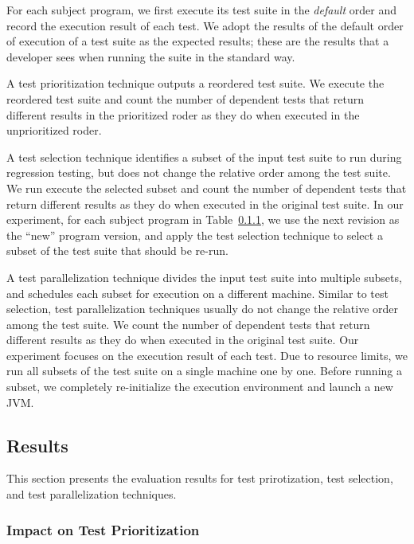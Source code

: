 For each subject program, we first execute its
test suite in the \textit{default} order and record
the execution result of each test.
We adopt the results of the default
order of execution of a test suite as the expected results; these
are the results that a developer sees when running the suite
in the standard way. 

A test prioritization technique outputs a reordered test suite.
We execute the reordered test suite and count the number
of dependent tests that return different results
in the prioritized roder as they do when executed in the
unprioritized roder.

A test selection technique identifies a subset of the
input test suite to run during regression testing, but does not
change the relative order among the test suite. We run execute
the selected subset and count the number of dependent tests
that return different results as they do when executed
in the original test suite. In our experiment, for each
subject program in Table~\ref{}, we use the next revision
as the ``new'' program version, and apply the test selection
technique to select a subset of the test suite that should
be re-run.

A test parallelization technique divides the input
test suite into multiple subsets, and schedules each
subset for execution on a different machine. Similar to
test selection, test parallelization techniques usually
do not change the relative order among the test suite.
We count the number of dependent tests that return different
results as they do when executed in the original test suite.
Our experiment focuses on the execution result of each test.
Due to resource limits, we run all subsets of the test suite
on a single machine one by one. Before running a subset,
we completely re-initialize the execution environment and launch
a new JVM.

\subsection{Results}

This section presents the evaluation results
for test prirotization, test selection, and
test parallelization techniques.

\subsubsection{Impact on Test Prioritization}

